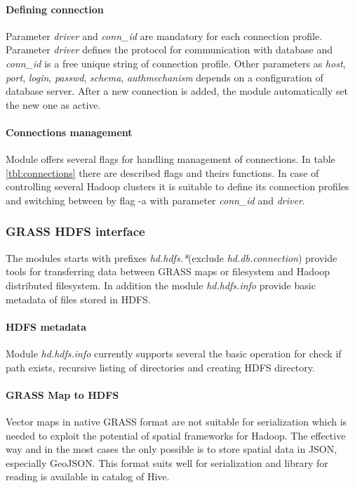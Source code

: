 \documentclass[a4paper,12pt,oneside]{report}
\begin{document}
    \paragraph{Defining connection} Parameter \textit{driver} and \textit{conn\_id}
    are mandatory for each connection profile. Parameter \textit{driver} defines the
    protocol for communication with database and  \textit{conn\_id} is a free
    unique string of connection profile. Other parameters as \textit{host},
    \textit{port}, \textit{login}, \textit{passwd}, \textit{schema},
    \textit{authmechanism} depends on a configuration of database server. After a new
    connection is added, the module automatically set the new one as active. 
    
    \paragraph{Connections management} Module offers several flags for handling
    management of connections. In table \ref{tbl:connections} there are described flags and
    theirs functions. In case of controlling several Hadoop clusters it is suitable 
    to define its connection profiles and switching between by flag -a with parameter
    \textit{conn\_id} and \textit{driver}.
    

    \subsubsection{GRASS HDFS interface}
    The modules starts with prefixes \textit{hd.hdfs.*}(exclude \textit{hd.db.connection})
    provide tools for transferring data between GRASS maps or filesystem and Hadoop
    distributed filesystem. In addition the module \textit{hd.hdfs.info} provide basic
    metadata of files stored in HDFS.
    
    \paragraph{HDFS metadata} Module \textit{hd.hdfs.info} currently supports several
    the basic operation for check if path exists, recursive listing of directories and
    creating HDFS directory.
    
    
    \paragraph{GRASS Map to HDFS} Vector maps in native GRASS format are not
    suitable for serialization which is needed to exploit the potential of
    spatial frameworks for Hadoop. The effective way and in the most cases the only
    possible is to store spatial data in JSON, especially GeoJSON. This format suits well  
    for serialization and library for reading is available in 
    catalog of Hive. 
    
\end{document}
